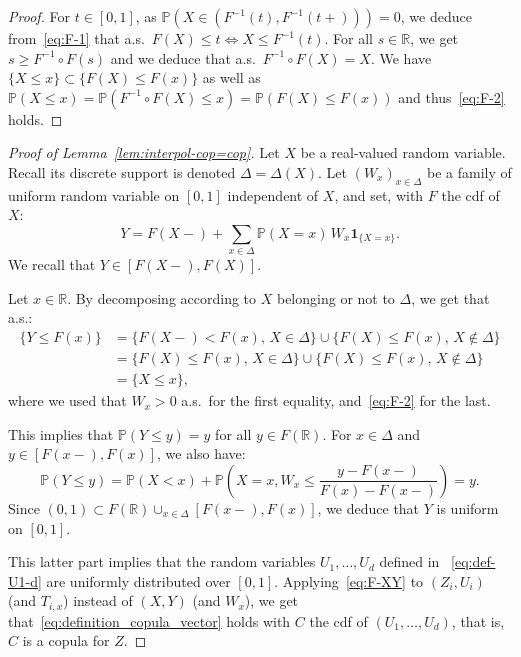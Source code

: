 \documentclass[12pt]{article}
\renewcommand{\P}{{\mathbb P}}
\newcommand{\R}{{\mathbb R}}
\newcommand{\ind}{\mathbf{1}}
\theoremstyle{plain}
\theoremstyle{remark}
\begin{document}
\begin{proof} For $t \in [0,1]$, as $\P(X\in (F^{-1}(t), F^{-1}(t+)))=0$,  we deduce from~\eqref{eq:F-1} that a.s.\ $F(X)\leq t \Longleftrightarrow X\leq  F^{-1}( t)$.
  For all $s\in \R$, we get $s \geq F^{-1} \circ F(s) $ and we deduce that a.s.\
  $F^{-1} \circ F(X)=X$.
We have $\{X\leq  x\}\subset \{F(X) \leq  F(x)\}$ as well as $\P(X\leq
x)=\P(F^{-1} \circ F(X) \leq  x)=\P(F(X) \leq  F(x))$ and
thus~\eqref{eq:F-2} holds. 
\end{proof}



\begin{proof}[Proof of Lemma~\ref{lem:interpol-cop=cop}]
  Let  $X$  be a  real-valued  random  variable. Recall its discrete
  support is denoted $\Delta=\Delta(X)$. Let   $(W_x)_{x\in
    \Delta}$ be a family of  uniform  random
  variable on $[0,1]$  independent of $X$,  and set, with  $F$ the cdf of
  $X$:
\[
  Y=F(X-) +   \sum_{x\in  \Delta} \P(X=x)\, W_x \ind_{\{X=x\}}.
\]
  We recall that $Y\in [F(X-),
  F(X)]$.

Let $x\in \R$. By decomposing according to $X$ belonging or not to $\Delta$, we get
that a.s.:
\begin{align}
  \nonumber
  \{Y\leq
  F(x)\}
  &= \{F(X-) < F(x), \, X\in \Delta\} \cup\{F(X) \leq  F(x),\,
    X\not\in \Delta\}\\
  \nonumber
   &= \{F(X)\leq F(x), \, X\in \Delta\}
    \cup \{F(X) \leq  F(x),\,    X\not\in \Delta\}\\
  &= \{X\leq  x\},
    \label{eq:F-XY}
\end{align}
where  we used that  $W_x>0$ a.s.\ for the
first equality, and~\eqref{eq:F-2} for the last. 


This implies  that  $\P(Y\leq  y)=y$ for all $y\in F(\R)$. 
    For $x\in  \Delta$ and $y\in [F(x-), F(x)]$,
  we also have:
\[
  \P(Y\leq    y)=\P(X<x)+    \P\left(X=x,   W_x\leq    \frac{y-F(x-)}{F(x)
      -F(x-)}\right) =y .
\]
Since
$(0,1)\subset  F(\R)\cup_{x\in \Delta}[F(x-), F(x)]
$, we  deduce that  $Y$ is  uniform on  $[0,1]$.

\medskip

This latter part implies that  the random
variables   $U_1, \ldots, U_d$ defined in~ \eqref{eq:def-U1-d} are  uniformly  distributed  over
$[0,1]$. Applying~\eqref{eq:F-XY} to
$(Z_i,U_i)$ (and $T_{i,x}$) instead of $(X,Y)$ (and $W_x$), we
get that~\eqref{eq:definition_copula_vector} holds with $C$ the cdf of
$(U_1, \ldots, U_d)$, 
 that is, $C$ is a copula for $Z$.
\end{proof}
\end{document}
